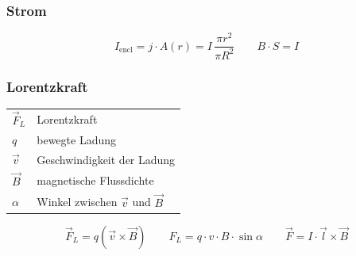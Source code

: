 \documentclass[10pt,a4paper]{article}
\begin{document}
	\subsubsection*{Strom}
	\[
	I_{\text{encl}} = j \cdot A(r) = I\,\frac{\pi r^2}{\pi R^2}
	\qquad
	B \cdot S = I
	\]
	
	\subsubsection*{Lorentzkraft}
	
	\begin{tabular}{@{}ll@{}}
		$\vec{F}_L$ & Lorentzkraft \\
		$q$         & bewegte Ladung \\
		$\vec{v}$   & Geschwindigkeit der Ladung \\
		$\vec{B}$   & magnetische Flussdichte \\
		$\alpha$    & Winkel zwischen $\vec{v}$ und $\vec{B}$ \\
	\end{tabular}
	
	\[
	\vec{F}_L = q(\vec{v}\times\vec{B})
	\qquad
	F_L = q \cdot v \cdot B \cdot \sin\alpha
	\qquad
	\vec{F} = I \cdot \vec{l} \times \vec{B}
	\]
	
\end{document}
